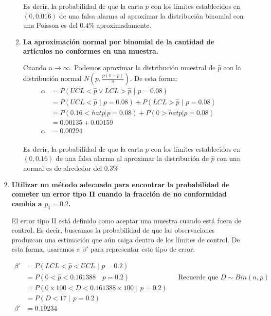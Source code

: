 \documentclass{article}
\begin{document}
\begin{enumerate}[label= \textbf{\alph*)}]
\begin{enumerate}[label= \textbf{\arabic*)}]
        Es decir, la probabilidad de que la carta $p$ con los límites establecidos en $(0, 0.016)$ de una falsa alarma al aproximar la distribución binomial con una Poisson es del $0.4 \%$ aproximadamente. 
        
        \item \textbf{La aproximación normal por binomial de la cantidad de artículos no conformes en una muestra.}

        Cuando $n \rightarrow \infty$. Podemos aproximar la distribución muestral de $\hat{p}$ con la distribución normal $N(p, \frac{p(1-p)}{n})$. De esta forma:
        \begin{align*}
            \alpha &= P(UCL < \hat{p} \lor LCL > \hat{p} \,\, | \,\, p = 0.08) &&\\
            &= P(UCL < \hat{p} \,\, | \,\, p = 0.08) + P(LCL > \hat{p} \,\, | \,\, p = 0.08) && \\
            &= P(0.16 < hat{p} | p = 0.08) + P(0 > hat{p} | p = 0.08) && \\
            &= 0.00135 + 0.00159 && \\
            \alpha &= 0.00294 && \\
        \end{align*}

        Es decir, la probabilidad de que la carta $p$ con los límites establecidos en $(0, 0.16)$ de una falsa alarma al aproximar la distribución de $\hat{p}$ con una normal es de alrededor del $0.3 \%$
    
    \end{enumerate}
    \item \textbf{Utilizar un método adecuado para encontrar la probabilidad de cometer un error tipo II cuando la fracción de no conformidad cambia a $p_1 = 0.2$.}

    El error tipo II está definido como aceptar una muestra cuando está fuera de control. Es decir, buscamos la probabilidad de que las observaciones produzcan una estimación que aún caiga dentro de los límites de control. De esta forma, usaremos a $\beta'$ para representar este tipo de error.

    \begin{align*}
        \beta' &= P(LCL < \hat{p} < UCL \,\, | \,\, p = 0.2) &&\\
        &= P(0 < \hat{p} < 0.161388 \,\, | \,\, p = 0.2) && \text{Recuerde que $D \sim Bin(n,p)$} \\
        &= P(0 \times 100 < D < 0.161388 \times 100 \,\, | \,\, p = 0.2) && \\
        &= P(D < 17 \,\, | \,\, p = 0.2) && \\
        \beta' &= 0.19234 &&
    \end{align*}


\end{enumerate}
\end{document}
